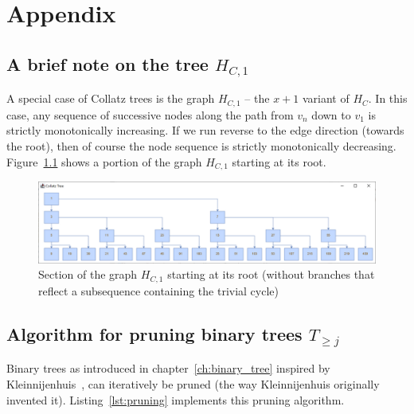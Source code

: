 \appendix
\chapter{Appendix}

\section{\texorpdfstring{A brief note on the tree $H_{C,1}$}{A brief note on the tree HC1}}
\label{appx:x_plus_1_variant}
A special case of Collatz trees is the graph $H_{C,1}$ -- the $x+1$ variant of $H_C$. In this case, any sequence of successive nodes along the path from $v_n$ down to $v_1$ is strictly monotonically increasing. If we run reverse to the edge direction (towards the root), then of course the node sequence is strictly monotonically decreasing. Figure~\ref{fig:hc1} shows a portion of the graph $H_{C,1}$ starting at its root.

\begin{figure}[H]
	\includegraphics[width=1.00\textwidth]{figures/h_c1.png}
	\caption{Section of the graph $H_{C,1}$ starting at its root (without branches that reflect a subsequence containing the trivial cycle)}
	\label{fig:hc1}
\end{figure}

\section{\texorpdfstring{Algorithm for pruning binary trees $T_{\ge j}$}{Algorithm for pruning binary trees Tj}}
\label{appx:pruning}
Binary trees as introduced in chapter~\ref{ch:binary_tree} inspired by Kleinnijenhuis~\cite{Ref_Kleinnijenhuis_2020a}, \cite{Ref_Kleinnijenhuis_2020b} can iteratively be pruned (the way Kleinnijenhuis originally invented it). Listing~\ref{lst:pruning} implements this pruning algorithm.

